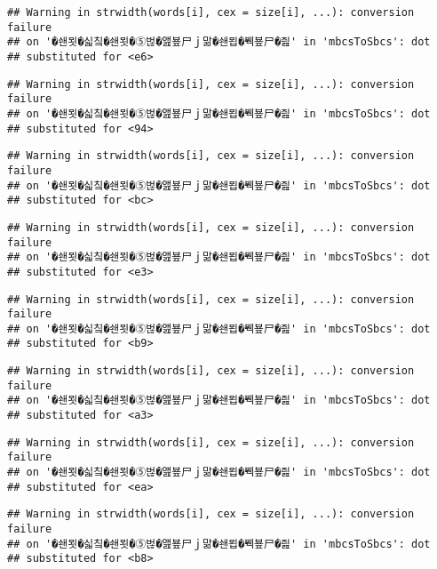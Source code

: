 \documentclass[]{article}
\begin{document}
\begin{verbatim}
## Warning in strwidth(words[i], cex = size[i], ...): conversion failure
## on '�쇈묏�싧칰�쇈묏�⑤벊�앮뵾尸ｊ맒�쇈묍�붹뵾尸�즲' in 'mbcsToSbcs': dot
## substituted for <e6>
\end{verbatim}

\begin{verbatim}
## Warning in strwidth(words[i], cex = size[i], ...): conversion failure
## on '�쇈묏�싧칰�쇈묏�⑤벊�앮뵾尸ｊ맒�쇈묍�붹뵾尸�즲' in 'mbcsToSbcs': dot
## substituted for <94>
\end{verbatim}

\begin{verbatim}
## Warning in strwidth(words[i], cex = size[i], ...): conversion failure
## on '�쇈묏�싧칰�쇈묏�⑤벊�앮뵾尸ｊ맒�쇈묍�붹뵾尸�즲' in 'mbcsToSbcs': dot
## substituted for <bc>
\end{verbatim}

\begin{verbatim}
## Warning in strwidth(words[i], cex = size[i], ...): conversion failure
## on '�쇈묏�싧칰�쇈묏�⑤벊�앮뵾尸ｊ맒�쇈묍�붹뵾尸�즲' in 'mbcsToSbcs': dot
## substituted for <e3>
\end{verbatim}

\begin{verbatim}
## Warning in strwidth(words[i], cex = size[i], ...): conversion failure
## on '�쇈묏�싧칰�쇈묏�⑤벊�앮뵾尸ｊ맒�쇈묍�붹뵾尸�즲' in 'mbcsToSbcs': dot
## substituted for <b9>
\end{verbatim}

\begin{verbatim}
## Warning in strwidth(words[i], cex = size[i], ...): conversion failure
## on '�쇈묏�싧칰�쇈묏�⑤벊�앮뵾尸ｊ맒�쇈묍�붹뵾尸�즲' in 'mbcsToSbcs': dot
## substituted for <a3>
\end{verbatim}

\begin{verbatim}
## Warning in strwidth(words[i], cex = size[i], ...): conversion failure
## on '�쇈묏�싧칰�쇈묏�⑤벊�앮뵾尸ｊ맒�쇈묍�붹뵾尸�즲' in 'mbcsToSbcs': dot
## substituted for <ea>
\end{verbatim}

\begin{verbatim}
## Warning in strwidth(words[i], cex = size[i], ...): conversion failure
## on '�쇈묏�싧칰�쇈묏�⑤벊�앮뵾尸ｊ맒�쇈묍�붹뵾尸�즲' in 'mbcsToSbcs': dot
## substituted for <b8>
\end{verbatim}
\end{document}
